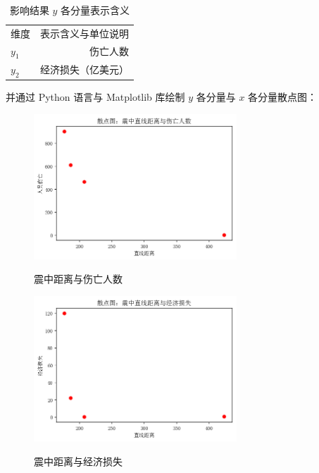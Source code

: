 \documentclass[UTF8]{ctexart}
\begin{document}
\begin{table}[htbp]
  \centering
  \caption{影响结果 $y$ 各分量表示含义}
  \label{tab:yDescription}
  \begin{tabular}{lr}
    维度    & 表示含义与单位说明 \\
    $y_1$ & 伤亡人数      \\
    $y_2$ & 经济损失（亿美元）
  \end{tabular}
\end{table}

并通过 Python 语言与 Matplotlib 库绘制 $y$ 各分量与 $x$ 各分量散点图：

\begin{figure}[htbp]
  \begin{minipage}[t]{0.5\linewidth}
    \centering
    \includegraphics[width=3in]{../images/scatter-distance-person.png}
    \label{fig:scatter:distance-person}
    \caption{震中距离与伤亡人数}
  \end{minipage}
  \begin{minipage}[t]{0.5\linewidth}
    \centering
    \includegraphics[width=3in]{../images/scatter-distance-economy.png}
    \label{fig:scatter:distance-economy}
    \caption{震中距离与经济损失}
\end{minipage}
\end{figure}
\end{document}
